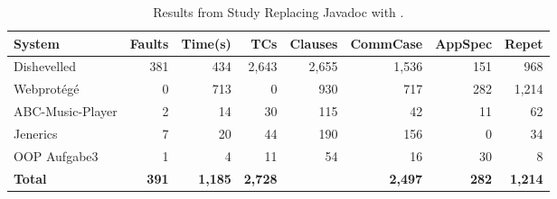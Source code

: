 \begin{table}
\centering
\caption{Results from Study Replacing Javadoc with \contractjdoc{}.}
\label{tab:caseStudyResults}
\begin{adjustbox}{width=\textwidth}
\begin{tabular}{lrrrrrrr} 
\hline
\multicolumn{1}{l}{\textbf{System}} & \textbf{Faults} & \textbf{Time(s)} & \textbf{TCs}     & \textbf{Clauses}                          & \textbf{CommCase} & \textbf{AppSpec} & \textbf{Repet}  \\ 
\hline
Dishevelled       & 381                                 & 434                                     & 2,643                            & 2,655                                     & 1,536                                  & 151                                    & 968                                   \\
Webprotégé      & 0                                   & 713                                     & 0                                & 930                                       & 717                                    & 282                                    & 1,214                                 \\
ABC-Music-Player  & 2                                   & 14                                      & 30                               & 115                                       & 42                                     & 11                                     & 62                                    \\
Jenerics          & 7                                   & 20                                      & 44                               & 190                                       & 156                                    & 0                                      & 34                                    \\
OOP Aufgabe3      & 1                                   & 4                                       & 11                               & 54                                        & 16                                     & 30                                     & 8                                     \\
\bottomrule
\textbf{ Total }  & \textbf{391}                      & \textbf{1,185}                        & \textbf{ 2,728 }                 & \textbf{\totalClauses{}} & \textbf{ 2,497 }                       & \textbf{ 282 }                         & \textbf{ 1,214}                       \\
\bottomrule
\end{tabular}
\end{adjustbox}
\end{table}


